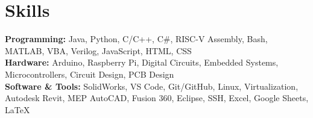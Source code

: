 \documentclass[11pt]{article}       %
\begin{document}
\vspace{-8pt}
\section*{Skills}
\vspace{3pt}

\textbf{Programming:} Java, Python, C/C++, C\#, RISC-V Assembly, Bash, MATLAB, VBA, Verilog, JavaScript, HTML, CSS \\
\textbf{Hardware:} Arduino, Raspberry Pi, Digital Circuits, Embedded Systems, Microcontrollers, Circuit Design, PCB Design \\
\textbf{Software \& Tools:} SolidWorks, VS Code, Git/GitHub, Linux, Virtualization, Autodesk Revit, MEP AutoCAD, Fusion 360, Eclipse, SSH, Excel, Google Sheets, LaTeX
\end{document}
